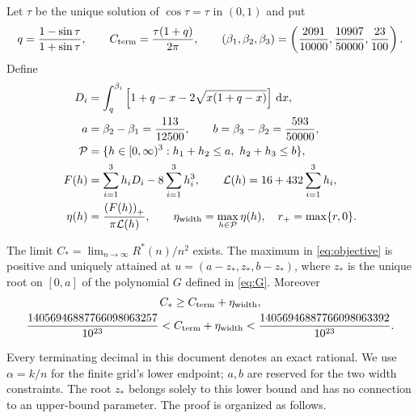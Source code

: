 \documentclass[review,supplement,hidelinks,onefignum,onetabnum]{siamart251216}
\newcommand{\Rstar}{R^*}
\newcommand{\Cterm}{C_{\rm term}}
\newcommand{\etaw}{\eta_{\rm width}}
\newcommand{\dd}{\,\mathrm d}
\newcommand{\pos}[1]{\left(#1\right)_+}
\begin{document}
Let $\tau$ be the unique solution of $\cos\tau=\tau$ in $(0,1)$ and put
\begin{equation}\label{eq:parameters}
q=\frac{1-\sin\tau}{1+\sin\tau},\qquad
\Cterm=\frac{\tau(1+q)}{2\pi},\qquad
(\beta_1,\beta_2,\beta_3)=
\left(\frac{2091}{10000},\frac{10907}{50000},\frac{23}{100}\right).
\end{equation}
Define
\begin{align}
D_i&=\int_q^{\beta_i}\left[1+q-x-2\sqrt{x(1+q-x)}\right]\dd x,
\label{eq:Di}\\
a&=\beta_2-\beta_1=\frac{113}{12500},\qquad
b=\beta_3-\beta_2=\frac{593}{50000},\nonumber\\
\mathcal P&=\{h\in[0,\infty)^3:h_1+h_2\le a,\ h_2+h_3\le b\},\nonumber\\
F(h)&=\sum_{i=1}^3h_iD_i-8\sum_{i=1}^3h_i^3,\qquad
\mathcal L(h)=16+432\sum_{i=1}^3h_i,\label{eq:objective}\\
\eta(h)&=\frac{\pos{F(h)}}{\pi\mathcal L(h)},\qquad
\etaw=\max_{h\in\mathcal P}\eta(h),\quad r_+=\max\{r,0\}.\nonumber
\end{align}

\begin{theorem}\label{thm:main}
The limit $C_*=\lim_{n\to\infty}\Rstar(n)/n^2$ exists. The maximum
in \eqref{eq:objective} is positive and uniquely attained at
$u=(a-z_*,z_*,b-z_*)$, where $z_*$ is the unique root on $[0,a]$ of
the polynomial $G$ defined in \eqref{eq:G}. Moreover
\begin{equation}\label{eq:mainbound}
\begin{gathered}
C_*\ge\Cterm+\etaw,\\
\frac{14056946887766098063257}{10^{23}}
<\Cterm+\etaw<
\frac{14056946887766098063392}{10^{23}}.
\end{gathered}
\end{equation}
\end{theorem}

Every terminating decimal in this document denotes an exact rational.
We use $\alpha=k/n$ for the finite grid's lower endpoint; $a,b$ are
reserved for the two width constraints. The root $z_*$ belongs solely
to this lower bound and has no connection to an upper-bound parameter.
The proof is organized as follows.
\end{document}
